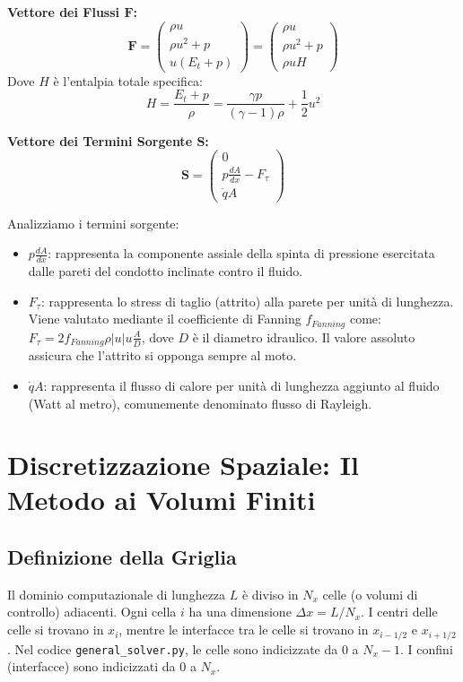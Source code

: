 \documentclass[11pt,a4paper]{article}
\begin{document}
\textbf{Vettore dei Flussi $\mathbf{F}$:}
\begin{equation}
\mathbf{F} = \begin{pmatrix} \rho u \\ \rho u^2 + p \\ u (E_t + p) \end{pmatrix} = \begin{pmatrix} \rho u \\ \rho u^2 + p \\ \rho u H \end{pmatrix}
\end{equation}
Dove $H$ è l'entalpia totale specifica:
\begin{equation}
H = \frac{E_t + p}{\rho} = \frac{\gamma p}{(\gamma - 1)\rho} + \frac{1}{2}u^2
\end{equation}

\textbf{Vettore dei Termini Sorgente $\mathbf{S}$:}
\begin{equation}
\mathbf{S} = \begin{pmatrix} 0 \\ p \frac{dA}{dx} - F_{\tau} \\ \dot{q} A \end{pmatrix}
\end{equation}

Analizziamo i termini sorgente:
\begin{itemize}
    \item $p \frac{dA}{dx}$: rappresenta la componente assiale della spinta di pressione esercitata dalle pareti del condotto inclinate contro il fluido.
    \item $F_{\tau}$: rappresenta lo stress di taglio (attrito) alla parete per unità di lunghezza. Viene valutato mediante il coefficiente di Fanning $f_{Fanning}$ come: $F_{\tau} = 2 f_{Fanning} \rho |u| u \frac{A}{D}$, dove $D$ è il diametro idraulico. Il valore assoluto assicura che l'attrito si opponga sempre al moto.
    \item $\dot{q} A$: rappresenta il flusso di calore per unità di lunghezza aggiunto al fluido (Watt al metro), comunemente denominato flusso di Rayleigh.
\end{itemize}

\section{Discretizzazione Spaziale: Il Metodo ai Volumi Finiti}

\subsection{Definizione della Griglia}
Il dominio computazionale di lunghezza $L$ è diviso in $N_x$ celle (o volumi di controllo) adiacenti. Ogni cella $i$ ha una dimensione $\Delta x = L / N_x$.
I centri delle celle si trovano in $x_i$, mentre le interfacce tra le celle si trovano in $x_{i-1/2}$ e $x_{i+1/2}$.
Nel codice \texttt{general\_solver.py}, le celle sono indicizzate da $0$ a $N_x-1$. I confini (interfacce) sono indicizzati da $0$ a $N_x$.
\end{document}

